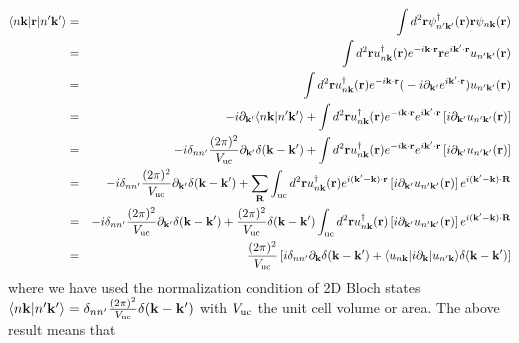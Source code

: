 \begin{eqnarray}
	 \langle n\mathbf k | \mathbf r | n' \mathbf k'\rangle &=& \int d^2\mathbf r \psi_{n'\mathbf k'}^\dag (\mathbf r) \mathbf r \psi_{n \mathbf k} (\mathbf r) \\\nonumber
	 & =& \int d^2\mathbf r u_{n\mathbf k}^\dag (\mathbf r) e^{-i\mathbf k \cdot \mathbf r}\mathbf r e^{i\mathbf k'\cdot \mathbf r } u_{n' \mathbf k'} (\mathbf r) \\\nonumber
	 &=& \int d^2\mathbf r u_{n\mathbf k}^\dag (\mathbf r) e^{-i\mathbf k \cdot \mathbf r}\mathbf (-i\partial_{\mathbf k'} e^{i\mathbf k'\cdot \mathbf r }) u_{n' \mathbf k'} (\mathbf r)\\\nonumber
	 &=& -i\partial_{\mathbf k'} \langle n\mathbf k | n'\mathbf k'\rangle  + \int d^2\mathbf r u_{n\mathbf k}^\dag (\mathbf r) e^{-i\mathbf k \cdot \mathbf r}e^{i\mathbf k'\cdot \mathbf r }  \left[i\partial_{\mathbf k'} u_{n' \mathbf k'} (\mathbf r)\right] \\\nonumber
	 &=&  -i\delta_{nn'} \frac{(2\pi)^2}{V_{\rm uc}}\partial_{\mathbf k'}\delta(\mathbf k  - \mathbf k')   + \int d^2\mathbf r u_{n\mathbf k}^\dag (\mathbf r) e^{-i\mathbf k \cdot \mathbf r}e^{i\mathbf k'\cdot \mathbf r }  \left[i\partial_{\mathbf k'} u_{n' \mathbf k'} (\mathbf r)\right] \\\nonumber
	 &=&  -i\delta_{nn'} \frac{(2\pi)^2}{V_{\rm uc}}\partial_{\mathbf k'}\delta(\mathbf k  - \mathbf k')   + \sum_{\mathbf R}\int_{\rm uc}  d^2\mathbf r u_{n\mathbf k}^\dag (\mathbf r) e^{i(\mathbf k' - \mathbf k) \cdot \mathbf r} \left[i\partial_{\mathbf k'} u_{n' \mathbf k'} (\mathbf r)\right] e^{i(\mathbf k' - \mathbf k)\cdot \mathbf R} \\\nonumber
	 &=& -i\delta_{nn'} \frac{(2\pi)^2}{V_{\rm uc}}\partial_{\mathbf k'}\delta(\mathbf k  - \mathbf k')   + \frac{(2\pi)^2}{V_{\rm uc}} \delta(\mathbf k - \mathbf k') \int_{\rm uc}  d^2\mathbf r u_{n\mathbf k}^\dag (\mathbf r) \left[i\partial_{\mathbf k'} u_{n' \mathbf k'} (\mathbf r)\right] e^{i(\mathbf k' - \mathbf k)\cdot \mathbf R}\\\nonumber
	 &=& \frac{(2\pi)^2}{V_{\rm uc}} \left[i\delta_{nn'} \partial_{\mathbf k}\delta(\mathbf k - \mathbf k') + \langle u_{n \mathbf k} | i\partial_{\mathbf k} | u_{n'\mathbf k}\rangle \delta(\mathbf k-\mathbf k') \right]
\end{eqnarray}
where we have used the normalization condition of 2D Bloch states $\langle n\mathbf k | n'\mathbf k'\rangle = \delta_{nn'} \frac{(2\pi)^2}{V_{\rm uc}}\delta(\mathbf k  - \mathbf k')  $ with $V_{\rm uc}$ the unit cell volume or area. The above result means that
